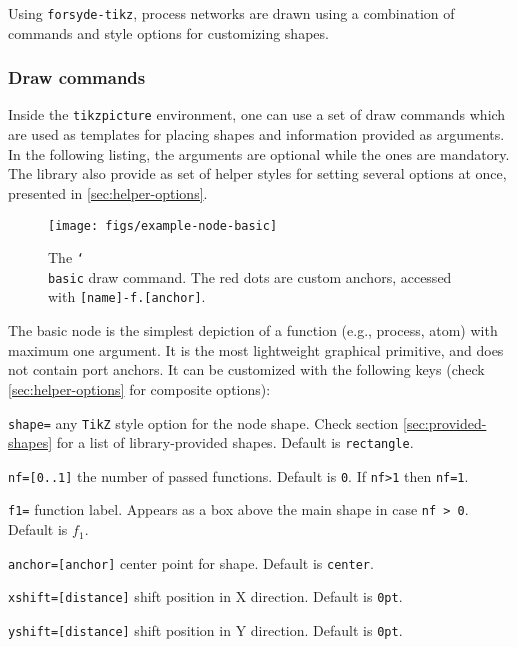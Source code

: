 \documentclass[10pt]{article}
\newenvironment{optionslist}[0]{ 
\begin{list}{}{
	\setlength{\itemindent}{-10pt}
	\setlength{\itemsep}{0pt}
	\setlength{\parsep}{0pt}
}}{\end{list}}
\newcommand\bookmark[1]{\marginpar{\ttfamily #1}}
\def\opt#1{\color{gray}{#1}}
\def\man#1{\color{black}{#1}}
\begin{document}
Using \texttt{forsyde-tikz}, process networks are drawn using a combination of commands and style options for customizing shapes. 

\subsubsection{Draw commands}
\label{sec:draw-commands}

Inside the \texttt{tikzpicture} environment, one can use a set of draw commands which are used as templates for placing shapes and information provided as arguments. In the following listing, the \opt{gray}\man{} arguments are optional while the \man{black} ones are mandatory. 
The library also provide as set of helper styles for setting several options at once, presented in \ref{sec:helper-options}.\\

\begin{figure}[htb]\centering
\texttt{[image: figs/example-node-basic]}

\caption{The \texttt{\char`\\basic} draw command. The red dots are custom anchors, accessed with \texttt{[name]-f.[anchor]}.}
\end{figure}
\hspace{1pt}\bookmark{\char`\\basic\opt{[options]}\opt{(name)}\opt{<position>}\man{\{label\}};}

\noindent The basic node is the simplest depiction of a function (e.g., process, atom) with maximum one argument. It is the most lightweight graphical primitive, and does not contain port anchors. It can be customized with the following keys (check \ref{sec:helper-options} for composite options):

\begin{optionslist}
\item \texttt{shape=} any \texttt{TikZ} style option for the node shape. Check section \ref{sec:provided-shapes} for a list of library-provided shapes. Default is \texttt{rectangle}.
\item \texttt{nf=[0..1]} the number of passed functions. Default is \texttt{0}. If \texttt{nf>1} then \texttt{nf=1}.
\item \texttt{f1=} function label. Appears as a box above the main shape in case \texttt{nf > 0}. Default is $f_1$.
\item \texttt{anchor=[anchor]} center point for shape. Default is \texttt{center}.
\item \texttt{xshift=[distance]} shift position in X direction. Default is \texttt{0pt}.
\item \texttt{yshift=[distance]} shift position in Y direction. Default is \texttt{0pt}.
\end{optionslist}
\end{document}
